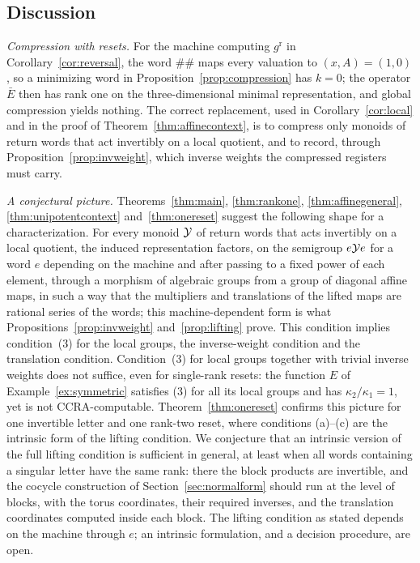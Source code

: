 \subsection{Discussion}\label{sec:singular-checks}
\emph{Compression with resets.} For the machine computing $g^{\mathrm r}$ in Corollary~\ref{cor:reversal}, the word $\#\#$ maps every valuation to $(x,A)=(1,0)$, so a minimizing word in Proposition~\ref{prop:compression} has $k=0$; the operator $\bar E$ then has rank one on the three-dimensional minimal representation, and global compression yields nothing. The correct replacement, used in Corollary~\ref{cor:local} and in the proof of Theorem~\ref{thm:affinecontext}, is to compress only monoids of return words that act invertibly on a local quotient, and to record, through Proposition~\ref{prop:invweight}, which inverse weights the compressed registers must carry.

\emph{A conjectural picture.} Theorems~\ref{thm:main}, \ref{thm:rankone}, \ref{thm:affinegeneral}, \ref{thm:unipotentcontext} and~\ref{thm:onereset} suggest the following shape for a characterization. For every monoid $\mathcal{Y}$ of return words that acts invertibly on a local quotient, the induced representation factors, on the semigroup $e\mathcal{Y} e$ for a word $e$ depending on the machine and after passing to a fixed power of each element, through a morphism of algebraic groups from a group of diagonal affine maps, in such a way that the multipliers and translations of the lifted maps are rational series of the words; this machine-dependent form is what Propositions~\ref{prop:invweight} and~\ref{prop:lifting} prove. This condition implies condition~(3) for the local groups, the inverse-weight condition and the translation condition. Condition~(3) for local groups together with trivial inverse weights does not suffice, even for single-rank resets: the function $E$ of Example~\ref{ex:symmetric} satisfies (3) for all its local groups and has $\kappa_2/\kappa_1=1$, yet is not CCRA-computable. Theorem~\ref{thm:onereset} confirms this picture for one invertible letter and one rank-two reset, where conditions (a)--(c) are the intrinsic form of the lifting condition. We conjecture that an intrinsic version of the full lifting condition is sufficient in general, at least when all words containing a singular letter have the same rank: there the block products are invertible, and the cocycle construction of Section~\ref{sec:normalform} should run at the level of blocks, with the torus coordinates, their required inverses, and the translation coordinates computed inside each block. The lifting condition as stated depends on the machine through $e$; an intrinsic formulation, and a decision procedure, are open.

